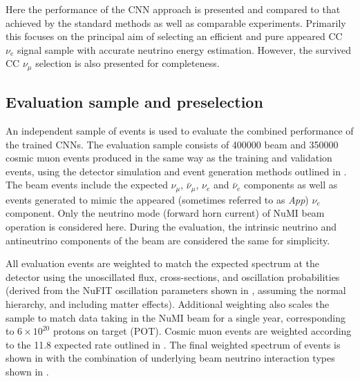 Here the performance of the CNN approach is presented and compared to that achieved by the
standard \chips methods as well as comparable experiments. Primarily this focuses on the principal
aim of selecting an efficient and pure appeared CC $\nu_{e}$ signal sample with accurate neutrino
energy estimation. However, the survived CC $\nu_{\mu}$ selection is also presented for
completeness.

\subsection{Evaluation sample and preselection} %
\label{sec:results_eval_sample} %

An independent sample of events is used to evaluate the combined performance of the trained CNNs.
The evaluation sample consists of 400000 beam and 350000 cosmic muon events produced in the same
way as the training and validation events, using the detector simulation and event generation
methods outlined in . The beam events include the expected
$\nu_{\mu}$, $\bar{\nu}_{\mu}$, $\nu_{e}$ and $\bar{\nu}_{e}$ components as well as events
generated to mimic the appeared (sometimes referred to as \emph{App}) $\nu_{e}$ component. Only
the neutrino mode (forward horn current) of NuMI beam operation is considered here. During the
evaluation, the intrinsic neutrino and antineutrino components of the beam are considered the same
for simplicity.

All evaluation events are weighted to match the expected spectrum at the \chipsfive detector using
the unoscillated flux, cross-sections, and oscillation probabilities (derived from the NuFIT
oscillation parameters shown in , assuming the normal hierarchy, and
including matter effects). Additional weighting also scales the sample to match data taking in the
NuMI beam for a single year, corresponding to $6\times 10^{20}$ protons on target (POT). Cosmic
muon events are weighted according to the \SI{11.8}{} expected \chipsfive rate outlined
in . The final weighted spectrum of events is shown in
 with the combination of underlying beam neutrino interaction
types shown in .

